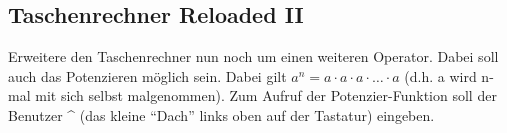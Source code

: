 \subsection{Taschenrechner Reloaded II }
Erweitere den Taschenrechner nun noch um einen weiteren Operator. Dabei soll auch das Potenzieren möglich sein. Dabei gilt $a^n=a\cdot a\cdot a \cdot\ldots\cdot a$ (d.h. a wird n-mal mit sich selbst malgenommen). Zum Aufruf der Potenzier-Funktion soll der Benutzer \^{} (das kleine "`Dach"' links oben auf der Tastatur) eingeben.